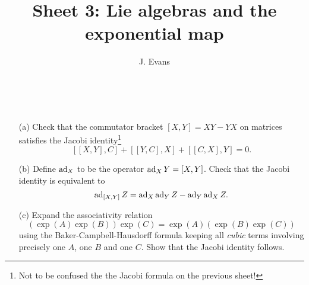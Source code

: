 \documentclass[12pt]{article}
\title{Sheet 3: Lie algebras and the exponential map}
\author{J. Evans}
\date{}
\begin{document}
\maketitle



\begin{question}\ \\
\begin{enumerate}
\item[(a)] Check that the commutator bracket $[X,Y]=XY-YX$ on matrices satisfies the Jacobi identity\footnote{Not to be confused the the Jacobi formula on the previous sheet!}
\[[[X,Y],C]+[[Y,C],X]+[[C,X],Y]=0.\]
\item[(b)] Define $\operatorname{ad}_X$ to be the operator $\operatorname{ad}_XY=[X,Y]$. Check that the Jacobi identity is equivalent to
  \[\operatorname{ad}_{[X,Y]}Z=\operatorname{ad}_X\operatorname{ad}_YZ-\operatorname{ad}_Y\operatorname{ad}_XZ.\]
\item[(c)] Expand the associativity relation
  \[(\exp(A)\exp(B))\exp(C)=\exp(A)(\exp(B)\exp(C))\]
  using the Baker-Campbell-Hausdorff formula keeping all {\em cubic} terms involving precisely one $A$, one $B$ and one $C$. Show that the Jacobi identity follows.
\end{enumerate}
\end{question}
\end{document}
